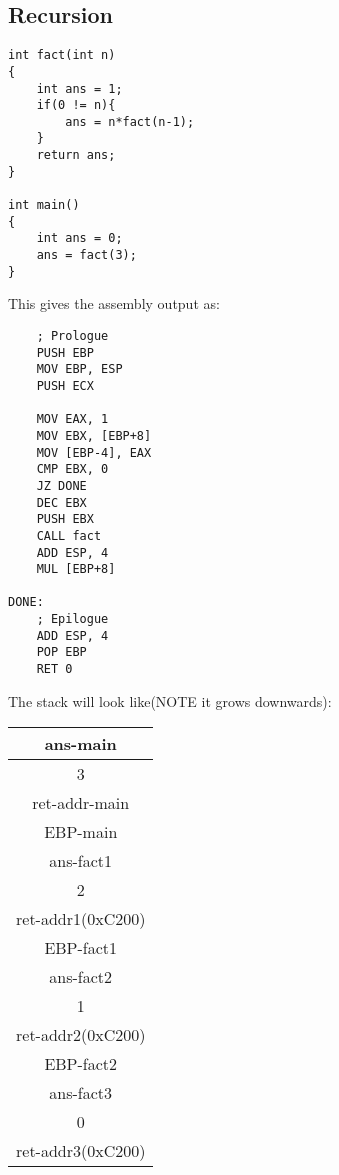 \documentclass[11pt,letterpaper]{article}
\begin{document}

\subsection*{Recursion}
\begin{verbatim}
int fact(int n)
{
	int ans = 1;
	if(0 != n){
		ans = n*fact(n-1);
	}
	return ans;
}

int main()
{
	int ans = 0;
	ans = fact(3);
}
\end{verbatim}
This gives the assembly output as:
\begin{verbatim}
	; Prologue
	PUSH EBP
	MOV EBP, ESP
	PUSH ECX

	MOV EAX, 1
	MOV EBX, [EBP+8]
	MOV [EBP-4], EAX
	CMP EBX, 0
	JZ DONE
	DEC EBX
	PUSH EBX
	CALL fact
	ADD ESP, 4
	MUL [EBP+8]

DONE:
	; Epilogue
	ADD ESP, 4
	POP EBP
	RET 0
\end{verbatim}
\pagebreak
The stack will look like(NOTE it grows downwards): 

\begin{center}
\begin{tabular}{|c|}
	\hline
	ans-main \\
	\hline
	3 \\
	\hline
	ret-addr-main \\
	\hline
	EBP-main \\
	\hline
	ans-fact1 \\
	\hline
	2 \\
	\hline
	ret-addr1(0xC200) \\
	\hline
	EBP-fact1 \\
	\hline
	ans-fact2 \\
	\hline
	1 \\
	\hline
	ret-addr2(0xC200) \\
	\hline
	EBP-fact2 \\
	\hline
	ans-fact3 \\
	\hline
	0 \\
	\hline
	ret-addr3(0xC200) \\
\end{tabular}
\end{center}
\end{document}
